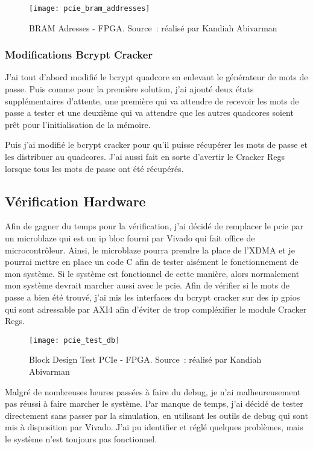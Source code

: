 \begin{figure}[tbph!]
	\centering
	\texttt{[image: pcie\_bram\_addresses]}
	\caption[BRAM Adresses - FPGA]{BRAM Adresses - FPGA. Source : réalisé par Kandiah Abivarman}
	\label{fig:pcie_bram_addresses}
\end{figure}

\subsubsection{Modifications Bcrypt Cracker}

J'ai tout d'abord modifié le bcrypt quadcore en enlevant le générateur de mots de passe.
Puis comme pour la première solution, j'ai ajouté deux états supplémentaires d'attente, une première qui va attendre de recevoir les mots de passe a tester et une deuxième qui va attendre que les autres quadcores soient prêt pour l'initialisation de la mémoire.

Puis j'ai modifié le bcrypt cracker pour qu'il puisse récupérer les mots de passe et les distribuer au quadcores.
J'ai aussi fait en sorte d'avertir le Cracker Regs lorsque tous les mots de passe ont été récupérés.

\subsection{Vérification Hardware}

Afin de gagner du temps pour la vérification, j'ai décidé de remplacer le \gls{pcie} par un microblaze qui est un \gls{ip} bloc fourni par Vivado qui fait office de microcontrôleur.
Ainsi, le microblaze pourra prendre la place de l'XDMA et je pourrai mettre en place un code C afin de tester aisément le fonctionnement de mon système.
Si le système est fonctionnel de cette manière, alors normalement mon système devrait marcher aussi avec le \gls{pcie}.
Afin de vérifier si le mots de passe a bien été trouvé, j'ai mis les interfaces du bcrypt cracker sur des \gls{ip} \gls{gpio}s qui sont adressable par AXI4 afin d'éviter de trop compléxifier le module Cracker Regs.

\begin{figure}[tbph!]
	\centering
	\texttt{[image: pcie\_test\_db]}
	\caption[Block Design Test PCIe - FPGA]{Block Design Test PCIe - FPGA. Source : réalisé par Kandiah Abivarman}
	\label{fig:pcie_test_db}
\end{figure}

Malgré de nombreuses heures passées à faire du debug, je n'ai malheureusement pas réussi à faire marcher le système.
Par manque de temps, j'ai décidé de tester directement sans passer par la simulation, en utilisant les outils de debug qui sont mis à disposition par Vivado.
J'ai pu identifier et réglé quelques problèmes, mais le système n'est toujours pas fonctionnel.
